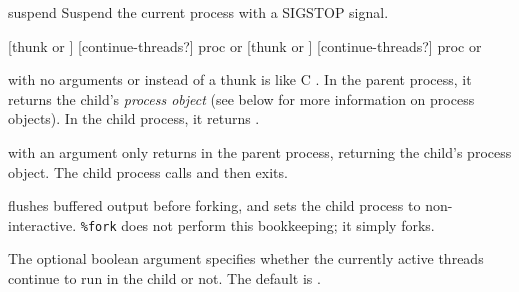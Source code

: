 \begin{defundesc}{suspend}{} \undefined
Suspend the current process with a SIGSTOP signal.
\end{defundesc}

   {[thunk or \sharpf] [continue-threads?]} {proc or \sharpf}
 {[thunk or \sharpf] [continue-threads?]} {proc or \sharpf}
\begin{desc}
   with no arguments or \sharpf{} instead of a thunk is like
  C
  .
  In the parent process, it returns the child's \emph{process object}
  (see below for more information on process objects).  In the child
  process, it returns {\sharpf}.

   with an argument only returns in the parent process, returning
  the child's process object.
  The child process calls  and then exits.
  
   flushes buffered output before forking, and sets the child
  process to non-interactive. \verb|%fork| does not perform this bookkeeping;
  it simply forks.
  
  The optional boolean argument  specifies
  whether the currently active threads continue to run in the child or
  not.  The default is \sharpf.
\end{desc}

